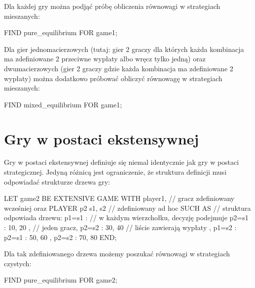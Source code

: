 \documentclass[polish]{standalone}
\begin{document}
Dla każdej gry można podjąć próbę obliczenia równowagi w strategiach mieszanych:

\begin{code}
FIND pure_equilibrium FOR game1;
\end{code}

Dla gier jednomacierzowych (tutaj: gier 2 graczy dla których każda kombinacja ma zdefiniowane 2 przeciwne wypłaty albo
wręcz tylko jedną) oraz dwumacierzowych (gier 2 graczy gdzie każda kombinacja ma zdefiniowane 2 wypłaty) można dodatkowo
próbować obliczyć równowagę w strategiach mieszanych:

\begin{code}
FIND mixed_equilibrium FOR game1;
\end{code}

\section{Gry w postaci ekstensywnej}

Gry w postaci ekstensywnej definiuje się niemal identycznie jak gry w postaci strategicznej. Jedyną różnicą jest
ograniczenie, że struktura definicji musi odpowiadać strukturze drzewa gry:

\begin{code}
LET game2 BE
  EXTENSIVE GAME
  WITH
    player1, // gracz zdefiniowany wcześniej oraz
    PLAYER p2 { s1, s2 } // zdefiniowany ad hoc
  SUCH AS      // struktura odpowiada drzewu:
    { p1=s1 :  // w każdym wierzchołku, decyzję podejmuje
      { p2=s1 : 10, 20 }, // jeden gracz,
      { p2=s2 : 30, 40 }  // liście zawierają wypłaty
    },
    { p1=s2 :
      { p2=s1 : 50, 60 },
      { p2=s2 : 70, 80 }
    }
  END;
\end{code}

Dla tak zdefiniowanego drzewa możemy poszukać równowagi w strategiach czystych:

\begin{code}
FIND pure_equilibrium FOR game2;
\end{code}
\end{document}
